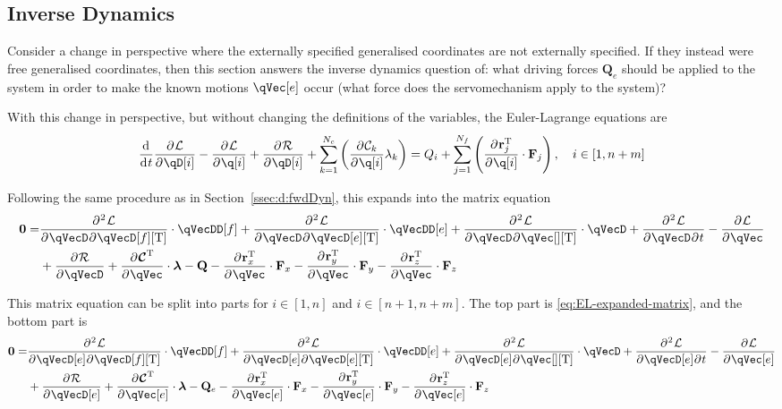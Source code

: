 \documentclass[11pt]{article}
\renewcommand{\secref}[1]{Section~\ref{#1}}
\newcommand{\oD}[2]{
    \frac{\mathrm{d}\mspace{1mu}#1}{\mathrm{d}\mspace{1mu}#2}
}
\newcommand{\pD}[2]{
    \frac{\partial\mspace{1mu}#1}{\partial\mspace{1mu}#2}
}
\newcommand{\pDD}[3]{
    \frac{\partial{^{\mspace{1mu}2}}\mspace{1mu}#1}{\partial\mspace{1mu}#2\mspace{1mu}\partial\mspace{1mu}#3}
}
\begin{document}
\subsection{Inverse Dynamics} \label{sssec:d:invDyn}
Consider a change in perspective where the externally specified generalised coordinates are not externally specified. If they instead were free generalised coordinates, then this section answers the inverse dynamics question of: what driving forces $\mathbf{Q}_e$ should be applied to the system in order to make the known motions $\qVec[e]$ occur (what force does the servomechanism apply to the system)?

With this change in perspective, but without changing the definitions of the variables, the Euler-Lagrange equations are
\begin{equation}
    \oD{}{t}\pD{\mathcal{L}}{\qD[i]} 
    - \pD{\mathcal{L}}{\q[i]} + \pD{\mathcal{R}}{\qD[i]}
    + \sum_{k=1}^{N_c} \del{\pD{\mathcal{C}_k}{\q[i]} \lambda_k}
    = Q_i + \sum_{j=1}^{N_f} \del{\pD{\mathbf{r}_j^{\mathrm{T}}}{\q[i]} \cdot \mathbf{F}_j}
    ,\quad i\in[1,n+m]
\end{equation}

Following the same procedure as in \secref{ssec:d:fwdDyn}, this expands into the matrix equation
\begin{align} \label{eq:EL-hybrid-matrix}
    \mathbf{0} =
    &\pDD{\mathcal{L}}{\qVecD}{\qVecD[f][\mathrm{T}]} \cdot \qVecDD[f]
    + \pDD{\mathcal{L}}{\qVecD}{\qVecD[e][\mathrm{T}]} \cdot \qVecDD[e]
    + \pDD{\mathcal{L}}{\qVecD}{\qVec[][\mathrm{T}]} \cdot \qVecD
    + \pDD{\mathcal{L}}{\qVecD}{t}
    - \pD{\mathcal{L}}{\qVec} \nonumber\\
    &+ \pD{\mathcal{R}}{\qVecD}
    + \pD{\bm{\mathcal{C}}^{\mathrm{T}}}{\qVec} \cdot \bm{\lambda}
    - \mathbf{Q}
    - \pD{\mathbf{r}_x^{\mathrm{T}}}{\qVec} \cdot \mathbf{F}_x
    - \pD{\mathbf{r}_y^{\mathrm{T}}}{\qVec} \cdot \mathbf{F}_y
    - \pD{\mathbf{r}_z^{\mathrm{T}}}{\qVec} \cdot \mathbf{F}_z
\end{align}

This matrix equation can be split into parts for $i\in[1,n]$ and $i\in[n+1,n+m]$. The top part is \eqref{eq:EL-expanded-matrix}, and the bottom part is
\begin{align}
    \mathbf{0} =
    &\pDD{\mathcal{L}}{\qVecD[e]}{\qVecD[f][\mathrm{T}]} \cdot \qVecDD[f]
    + \pDD{\mathcal{L}}{\qVecD[e]}{\qVecD[e][\mathrm{T}]} \cdot \qVecDD[e]
    + \pDD{\mathcal{L}}{\qVecD[e]}{\qVec[][\mathrm{T}]} \cdot \qVecD
    + \pDD{\mathcal{L}}{\qVecD[e]}{t}
    - \pD{\mathcal{L}}{\qVec[e]} \nonumber\\
    &+ \pD{\mathcal{R}}{\qVecD[e]}
    + \pD{\bm{\mathcal{C}}^{\mathrm{T}}}{\qVec[e]} \cdot \bm{\lambda}
    - \mathbf{Q}_e
    - \pD{\mathbf{r}_x^{\mathrm{T}}}{\qVec[e]} \cdot \mathbf{F}_x
    - \pD{\mathbf{r}_y^{\mathrm{T}}}{\qVec[e]} \cdot \mathbf{F}_y
    - \pD{\mathbf{r}_z^{\mathrm{T}}}{\qVec[e]} \cdot \mathbf{F}_z
\end{align}
\end{document}
